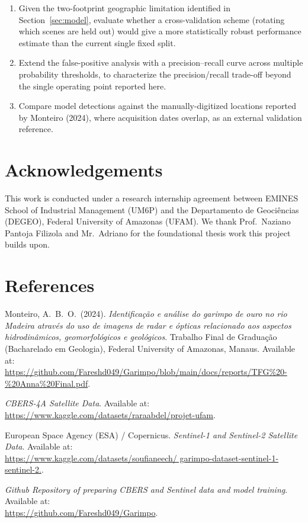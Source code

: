 \documentclass[11pt,a4paper]{article}
\begin{document}
\begin{enumerate}[nosep]
        train Dice 0.87 vs.\ validation Dice 0.52), through stronger
        regularization, more aggressive augmentation, or additional labeled
        data.
  \item Given the two-footprint geographic limitation identified in
        Section~\ref{sec:model}, evaluate whether a cross-validation scheme
        (rotating which scenes are held out) would give a more statistically
        robust performance estimate than the current single fixed split.
  \item Extend the false-positive analysis with a precision--recall curve
        across multiple probability thresholds, to characterize the
        precision/recall trade-off beyond the single operating point
        reported here.
  \item Compare model detections against the manually-digitized locations
        reported by Monteiro (2024), where acquisition dates overlap, as an
        external validation reference.
\end{enumerate}

\section*{Acknowledgements}
This work is conducted under a research internship agreement between EMINES
School of Industrial Management (UM6P) and the Departamento de
Geoci\^encias (DEGEO), Federal University of Amazonas (UFAM). We thank
Prof.\ Naziano Pantoja Filizola and Mr.\ Adriano 
for the foundational thesis work this project builds upon.


\section*{References}
\begin{footnotesize}

\noindent
Monteiro, A.\ B.\ O.\ (2024).
\textit{Identifica\c{c}\~ao e an\'alise do garimpo de ouro no rio Madeira
atrav\'es do uso de imagens de radar e \'opticas relacionado aos aspectos
hidrodin\^amicos, geomorfol\'ogicos e geol\'ogicos}.
Trabalho Final de Gradua\c{c}\~ao (Bacharelado em Geologia),
Federal University of Amazonas, Manaus.
Available at:\\
\url{https://github.com/Fareshd049/Garimpo/blob/main/docs/reports/TFG%20-%20Anna%20Final.pdf}.

\noindent
\textit{CBERS-4A Satellite Data}.
Available at:\\
\url{https://www.kaggle.com/datasets/raraabdel/projet-ufam}.

\noindent
European Space Agency (ESA) / Copernicus.
\textit{Sentinel-1 and Sentinel-2 Satellite Data}.
Available at:\\
\url{https://www.kaggle.com/datasets/soufianeech/ garimpo-dataset-sentinel-1-sentinel-2.}.

\noindent
\textit{Github Repository of preparing CBERS and Sentinel data and model training}.
Available at:\\
\url{https://github.com/Fareshd049/Garimpo}.




\end{footnotesize}
\end{document}
